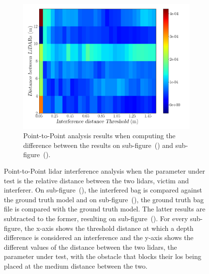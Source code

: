 \begin{figure}[!ht]
\begin{subfigure}[c]{0.45\textwidth}
	\label{fig:los:ground-truth-color-mesh}
\end{subfigure}
\\ \vspace{4mm}
\begin{subfigure}[c]{0.8\textwidth}
	\includegraphics[width=\textwidth]{img/lidar-interference/LOS/difference_ground_truth_interference_measurement.png}
	\caption{Point-to-Point analysis results when computing the difference between the results on sub-figure~() and sub-figure~().}
	\label{fig:los:difference-color-mesh}
\end{subfigure}

\caption{Point-to-Point \ac{lidar} interference analysis when the parameter under test is the relative distance between the two \acp{lidar}, victim and interferer. On sub-figure~(), the interfered bag is compared against the ground truth model and on sub-figure~(), the ground truth bag file is compared with the ground truth model. The latter results are subtracted to the former, resulting on sub-figure~(). For every sub-figure, the x-axis shows the threshold distance at which a depth difference is considered an interference and the y-axis shows the different values of the distance between the two \acp{lidar}, the parameter under test, with the obstacle that blocks their \ac{los} being placed at the medium distance between the two.}
\label{fig:los:color-mesh}
\end{figure}

